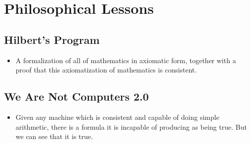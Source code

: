 \documentclass[12pt]{article}
\theoremstyle{definition}
\begin{document}
\section{Philosophical Lessons}

\subsection{Hilbert's Program}

\begin{itemize}
\item A formalization of all of mathematics in axiomatic form, together with a proof that this axiomatization of mathematics is consistent.
\end{itemize}

\subsection{We Are Not Computers 2.0}
\begin{itemize}
\item Given any machine which is consistent and capable of doing simple arithmetic, there is a formula it is incapable of producing as being true. But we can see that it is true.
\end{itemize}
\end{document}
